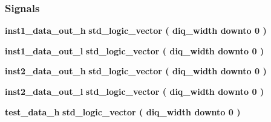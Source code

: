 \subsubsection*{Signals}
 \begin{DoxyCompactItemize}
\item 
{\bf inst1\+\_\+data\+\_\+out\+\_\+h} {\bfseries \textcolor{comment}{std\+\_\+logic\+\_\+vector}\textcolor{vhdlchar}{ }\textcolor{vhdlchar}{(}\textcolor{vhdlchar}{ }\textcolor{vhdlchar}{ }\textcolor{vhdlchar}{ }\textcolor{vhdlchar}{ }{\bfseries {\bf diq\+\_\+width}} \textcolor{vhdlchar}{ }\textcolor{keywordflow}{downto}\textcolor{vhdlchar}{ }\textcolor{vhdlchar}{ } \textcolor{vhdldigit}{0} \textcolor{vhdlchar}{ }\textcolor{vhdlchar}{)}\textcolor{vhdlchar}{ }} 
\item 
{\bf inst1\+\_\+data\+\_\+out\+\_\+l} {\bfseries \textcolor{comment}{std\+\_\+logic\+\_\+vector}\textcolor{vhdlchar}{ }\textcolor{vhdlchar}{(}\textcolor{vhdlchar}{ }\textcolor{vhdlchar}{ }\textcolor{vhdlchar}{ }\textcolor{vhdlchar}{ }{\bfseries {\bf diq\+\_\+width}} \textcolor{vhdlchar}{ }\textcolor{keywordflow}{downto}\textcolor{vhdlchar}{ }\textcolor{vhdlchar}{ } \textcolor{vhdldigit}{0} \textcolor{vhdlchar}{ }\textcolor{vhdlchar}{)}\textcolor{vhdlchar}{ }} 
\item 
{\bf inst2\+\_\+data\+\_\+out\+\_\+h} {\bfseries \textcolor{comment}{std\+\_\+logic\+\_\+vector}\textcolor{vhdlchar}{ }\textcolor{vhdlchar}{(}\textcolor{vhdlchar}{ }\textcolor{vhdlchar}{ }\textcolor{vhdlchar}{ }\textcolor{vhdlchar}{ }{\bfseries {\bf diq\+\_\+width}} \textcolor{vhdlchar}{ }\textcolor{keywordflow}{downto}\textcolor{vhdlchar}{ }\textcolor{vhdlchar}{ } \textcolor{vhdldigit}{0} \textcolor{vhdlchar}{ }\textcolor{vhdlchar}{)}\textcolor{vhdlchar}{ }} 
\item 
{\bf inst2\+\_\+data\+\_\+out\+\_\+l} {\bfseries \textcolor{comment}{std\+\_\+logic\+\_\+vector}\textcolor{vhdlchar}{ }\textcolor{vhdlchar}{(}\textcolor{vhdlchar}{ }\textcolor{vhdlchar}{ }\textcolor{vhdlchar}{ }\textcolor{vhdlchar}{ }{\bfseries {\bf diq\+\_\+width}} \textcolor{vhdlchar}{ }\textcolor{keywordflow}{downto}\textcolor{vhdlchar}{ }\textcolor{vhdlchar}{ } \textcolor{vhdldigit}{0} \textcolor{vhdlchar}{ }\textcolor{vhdlchar}{)}\textcolor{vhdlchar}{ }} 
\item 
{\bf test\+\_\+data\+\_\+h} {\bfseries \textcolor{comment}{std\+\_\+logic\+\_\+vector}\textcolor{vhdlchar}{ }\textcolor{vhdlchar}{(}\textcolor{vhdlchar}{ }\textcolor{vhdlchar}{ }\textcolor{vhdlchar}{ }\textcolor{vhdlchar}{ }{\bfseries {\bf diq\+\_\+width}} \textcolor{vhdlchar}{ }\textcolor{keywordflow}{downto}\textcolor{vhdlchar}{ }\textcolor{vhdlchar}{ } \textcolor{vhdldigit}{0} \textcolor{vhdlchar}{ }\textcolor{vhdlchar}{)}\textcolor{vhdlchar}{ }} 

\end{DoxyCompactItemize}
